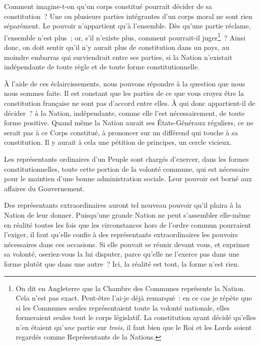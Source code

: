 \documentclass[french,twoside]{book} %
\begin{document}
Comment imagine-t-on qu’un corps constitué pourrait décider de sa constitution ? Une ou plusieurs parties intégrantes d’un corps moral ne sont rien séparément. Le pouvoir n’appartient qu’à l’ensemble. Dès qu’une partie réclame, l’ensemble n’est plus ; or, s’il n’existe plus, comment pourrait-il juger\footnote{On dit en Angleterre que la Chambre des Communes représente la Nation. Cela n’est pas exact. Peut-être l’ai-je déjà remarqué : en ce cas je répète que si les Communes seules représentaient toute la volonté nationale, elles formeraient seules tout le corps législatif. La constitution ayant décidé qu’elles n’en étaient qu’{\itshape une} partie sur {\itshape trois}, il faut bien que le Roi et les Lords soient regardés comme Représentants de la Nations.} ? Ainsi donc, on doit sentir qu’il n’y aurait plus de constitution dans un pays, au moindre embarras qui surviendrait entre ses parties, si la Nation n’existait indépendante de toute règle et de toute forme constitutionnelle.\par
À l’aide de ces éclaircissements, nous pouvons répondre à la question que nous nous sommes faite. Il est constant que les parties de ce que vous croyez être la constitution française ne sont pas d’accord entre elles. À qui donc appartient-il de décider ? à la Nation, indépendante, comme elle l’est nécessairement, de toute forme positive. Quand même la Nation aurait ses États-Généraux réguliers, ce ne serait pas à ce Corps constitué, à prononcer sur un différend qui touche à sa constitution. Il y aurait à cela une pétition de principes, un cercle vicieux.\par
Les représentants ordinaires d’un Peuple sont chargés d’exercer, dans les formes constitutionnelles, toute cette portion de la volonté commune, qui est nécessaire pour le maintien d’une bonne administration sociale. Leur pouvoir est borné aux affaires du Gouvernement.\par
Des représentants extraordinaires auront tel nouveau pouvoir qu’il plaira à la Nation de leur donner. Puisqu’une grande Nation ne peut s’assembler elle-même en réalité toutes les fois que les circonstances hors de l’ordre commun pourraient l’exiger, il faut qu’elle confie à des représentants extraordinaires les pouvoirs nécessaires dans ces occasions. Si elle pouvait se réunir devant vous, et exprimer sa volonté, oseriez-vous la lui disputer, parce qu’elle ne l’exerce pas dans une forme plutôt que dans une autre ? Ici, la réalité est tout, la forme n’est rien.\par
\end{document}
